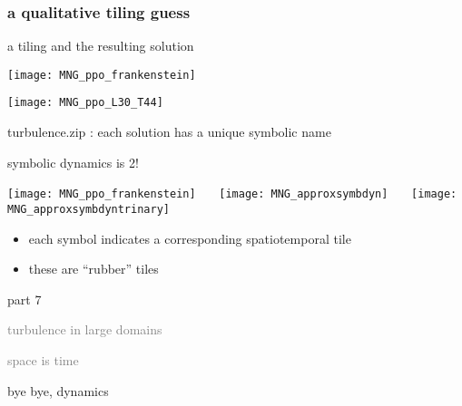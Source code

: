 \begin{frame}%
  \frametitle{a qualitative tiling guess}
  \begin{block} {a tiling and the resulting solution}
  \qquad
\begin{minipage}[height=.80\textheight]{.25\textheight}
\centering             %
  \qquad\qquad
\texttt{[image: MNG\_ppo\_frankenstein]}
\end{minipage} \quad\quad
\begin{minipage}[height=.80\textheight]{.25\textheight}
\texttt{[image: MNG\_ppo\_L30\_T44]}
\end{minipage} \qquad\qquad
  \end{block}
\end{frame}

\begin{frame}{turbulence.zip : each solution has a unique symbolic name}
  \begin{block} {symbolic dynamics is 2\dmn!}
  \begin{center}
  \texttt{[image: MNG\_ppo\_frankenstein]}
~~~\texttt{[image: MNG\_approxsymbdyn]}
~~~\texttt{[image: MNG\_approxsymbdyntrinary]}
  \end{center}
  \end{block}
\begin{itemize}
 \item each symbol indicates a corresponding spatiotemporal tile
 \item these are ``rubber'' tiles
\end{itemize}
\end{frame}

\begin{frame}{part 7}
\begin{enumerate}
              \item
    \textcolor{gray}{\small
turbulence in large domains
              \item
space is time
    }
              \item
    {\Large
bye bye, dynamics
    }
            \end{enumerate}
\end{frame}

